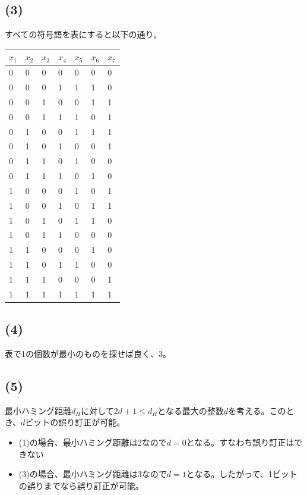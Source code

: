 \documentclass[a4paper,12pt,xelatex,ja=standard]{bxjsarticle}
\begin{document}
\subsection*{(3)}
すべての符号語を表にすると以下の通り。
\begin{table}[H]
  \centering
  \begin{tabular}{|l|l|l|l|l|l|l|}
  \hline
  $x_1$ & $x_2$ & $x_3$ & $x_4$ & $x_5$ & $x_6$ & $x_7$ \\ \hline \hline
  0     & 0     & 0     & 0     & 0     & 0     & 0     \\ \hline
  0     & 0     & 0     & 1     & 1     & 1     & 0     \\ \hline
  0     & 0     & 1     & 0     & 0     & 1     & 1     \\ \hline
  0     & 0     & 1     & 1     & 1     & 0     & 1     \\ \hline
  0     & 1     & 0     & 0     & 1     & 1     & 1     \\ \hline
  0     & 1     & 0     & 1     & 0     & 0     & 1     \\ \hline
  0     & 1     & 1     & 0     & 1     & 0     & 0     \\ \hline
  0     & 1     & 1     & 1     & 0     & 1     & 0     \\ \hline
  1     & 0     & 0     & 0     & 1     & 0     & 1     \\ \hline
  1     & 0     & 0     & 1     & 0     & 1     & 1     \\ \hline
  1     & 0     & 1     & 0     & 1     & 1     & 0     \\ \hline
  1     & 0     & 1     & 1     & 0     & 0     & 0     \\ \hline
  1     & 1     & 0     & 0     & 0     & 1     & 0     \\ \hline
  1     & 1     & 0     & 1     & 1     & 0     & 0     \\ \hline
  1     & 1     & 1     & 0     & 0     & 0     & 1     \\ \hline
  1     & 1     & 1     & 1     & 1     & 1     & 1     \\ \hline
  \end{tabular}
\end{table}

\subsection*{(4)}
表で1の個数が最小のものを探せば良く、3。

\subsection*{(5)}
最小ハミング距離$d_H$に対して$2d + 1 \leq d_H$となる最大の整数$d$を考える。このとき、$d$ビットの誤り訂正が可能。
\begin{itemize}
  \item (1)の場合、最小ハミング距離は2なので$d=0$となる。すなわち誤り訂正はできない
  \item (3)の場合、最小ハミング距離は3なので$d=1$となる。したがって、1ビットの誤りまでなら誤り訂正が可能。
\end{itemize}
\end{document}
